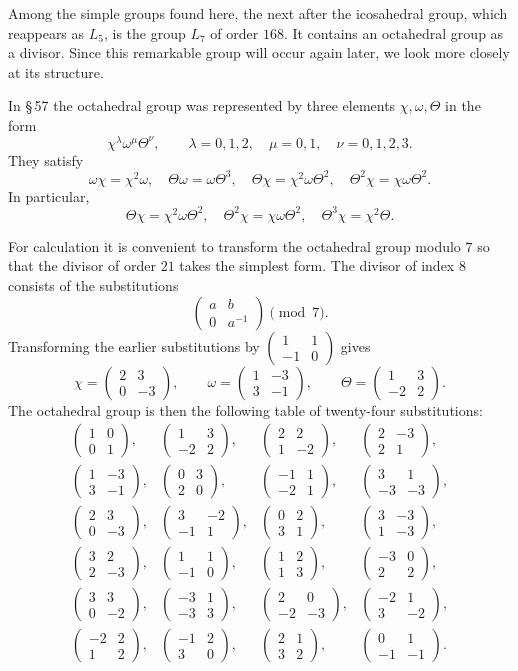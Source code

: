 \documentclass[11pt]{article}
\providecommand{\mat}[4]{\begin{pmatrix}#1&#2\\#3&#4\end{pmatrix}}
\providecommand{\mat}[4]{\begin{pmatrix}#1&#2\\#3&#4\end{pmatrix}}
\providecommand{\mat}[1]{\begin{pmatrix}#1\end{pmatrix}}
\begin{document}
Among the simple groups found here, the next after the icosahedral group, which reappears as $L_5$, is the group $L_7$ of order $168$. It contains an octahedral group as a divisor. Since this remarkable group will occur again later, we look more closely at its structure.

In \S\,57 the octahedral group was represented by three elements $\chi,\omega,\Theta$ in the form
\begin{equation}
 \chi^{\lambda}\omega^{\mu}\Theta^{\nu},
 \qquad \lambda=0,1,2,
 \quad \mu=0,1,
 \quad \nu=0,1,2,3.
 \tag{1}
\end{equation}
They satisfy
\begin{equation}
 \omega\chi=\chi^2\omega,
 \quad \Theta\omega=\omega\Theta^3,
 \quad \Theta\chi=\chi^2\omega\Theta^2,
 \quad \Theta^2\chi=\chi\omega\Theta^2.
 \tag{2}
\end{equation}
In particular,
\begin{equation}
 \Theta\chi=\chi^2\omega\Theta^2,
 \quad \Theta^2\chi=\chi\omega\Theta^2,
 \quad \Theta^3\chi=\chi^2\Theta.
 \tag{3}
\end{equation}

For calculation it is convenient to transform the octahedral group modulo $7$ so that the divisor of order $21$ takes the simplest form. The divisor of index $8$ consists of the substitutions
\begin{equation}
 \mat{a}{b}{0}{a^{-1}}\pmod7.
 \tag{4}
\end{equation}
Transforming the earlier substitutions by $\mat{1}{1}{-1}{0}$ gives
\begin{equation}
 \chi=\mat{2}{3}{0}{-3},
 \qquad
 \omega=\mat{1}{-3}{3}{-1},
 \qquad
 \Theta=\mat{1}{3}{-2}{2}.
 \tag{5}
\end{equation}
The octahedral group is then the following table of twenty-four substitutions:
\begin{equation}
\begin{array}{rrrr}
\mat{1}{0}{0}{1},&\mat{1}{3}{-2}{2},&\mat{2}{2}{1}{-2},&\mat{2}{-3}{2}{1},\\[0.7em]
\mat{1}{-3}{3}{-1},&\mat{0}{3}{2}{0},&\mat{-1}{1}{-2}{1},&\mat{3}{1}{-3}{-3},\\[0.7em]
\mat{2}{3}{0}{-3},&\mat{3}{-2}{-1}{1},&\mat{0}{2}{3}{1},&\mat{3}{-3}{1}{-3},\\[0.7em]
\mat{3}{2}{2}{-3},&\mat{1}{1}{-1}{0},&\mat{1}{2}{1}{3},&\mat{-3}{0}{2}{2},\\[0.7em]
\mat{3}{3}{0}{-2},&\mat{-3}{1}{-3}{3},&\mat{2}{0}{-2}{-3},&\mat{-2}{1}{3}{-2},\\[0.7em]
\mat{-2}{2}{1}{2},&\mat{-1}{2}{3}{0},&\mat{2}{1}{3}{2},&\mat{0}{1}{-1}{-1}.
\end{array}
\tag{6}
\end{equation}
\end{document}
